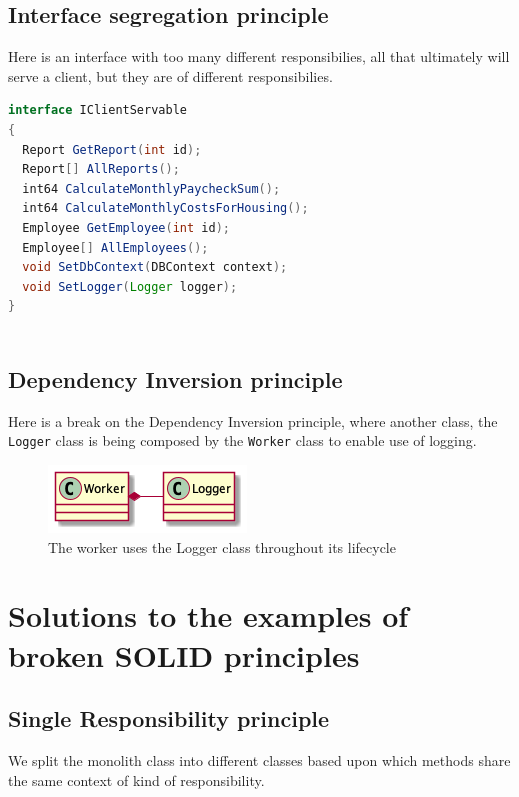 \documentclass[12pt,letterpaper]{article}
\begin{document}
\pagebreak
\subsection*{Interface segregation principle}

Here is an interface with too many different responsibilies, all that ultimately will serve a client, but they are of different responsibilies.

\begin{lstlisting}[language=Java]
interface IClientServable
{
  Report GetReport(int id);
  Report[] AllReports();
  int64 CalculateMonthlyPaycheckSum();
  int64 CalculateMonthlyCostsForHousing();
  Employee GetEmployee(int id);
  Employee[] AllEmployees();
  void SetDbContext(DBContext context);
  void SetLogger(Logger logger);
}
  
\end{lstlisting}

\subsection*{Dependency Inversion principle}

Here is a break on the Dependency Inversion principle, where another class, the \texttt{Logger} class is being composed by the \texttt{Worker} class to enable use of logging.

\begin{figure}[h]
  \centering
  \includegraphics{../out/Documents/plantuml/exercise4_dependency_inversion/exercise4_dependency_inversion.png}
  \caption{The worker uses the Logger class throughout its lifecycle}
\end{figure}

\pagebreak
\section*{Solutions to the examples of broken SOLID principles}

\subsection*{Single Responsibility principle}

We split the monolith class into different classes based upon which methods share the same context of kind of responsibility.
\end{document}
